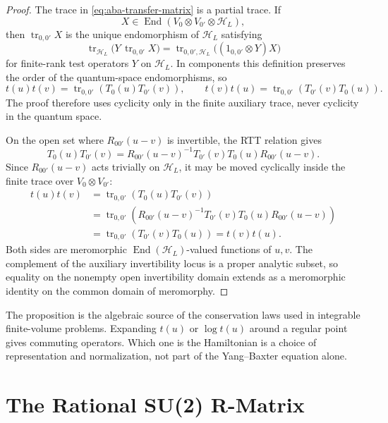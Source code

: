 \begin{proof}
The trace in \eqref{eq:aba-transfer-matrix} is a partial trace.  If
\[
  X\in\operatorname{End}(V_0\otimes V_{0'}\otimes\mathcal H_L),
\]
then \(\operatorname{tr}_{0,0'}X\) is the unique endomorphism of
\(\mathcal H_L\) satisfying
\[
  \operatorname{tr}_{\mathcal H_L}
  \bigl(Y\,\operatorname{tr}_{0,0'}X\bigr)
  =
  \operatorname{tr}_{0,0',\mathcal H_L}
  \bigl((1_{0,0'}\otimes Y)X\bigr)
\]
for finite-rank test operators \(Y\) on \(\mathcal H_L\).  In components this
definition preserves the order of the quantum-space endomorphisms, so
\[
  t(u)t(v)
  =
  \operatorname{tr}_{0,0'}\!\left(T_0(u)T_{0'}(v)\right),
  \qquad
  t(v)t(u)
  =
  \operatorname{tr}_{0,0'}\!\left(T_{0'}(v)T_0(u)\right).
\]
The proof therefore uses cyclicity only in the finite auxiliary trace, never
cyclicity in the quantum space.

On the open set where \(R_{00'}(u-v)\) is invertible, the RTT relation gives
\[
  T_0(u)T_{0'}(v)
  =
  R_{00'}(u-v)^{-1}T_{0'}(v)T_0(u)R_{00'}(u-v).
\]
Since \(R_{00'}(u-v)\) acts trivially on \(\mathcal H_L\), it may be moved
cyclically inside the finite trace over \(V_0\otimes V_{0'}\):
\[
\begin{aligned}
  t(u)t(v)
  &=
  \operatorname{tr}_{0,0'}\!\left(T_0(u)T_{0'}(v)\right)  \\
  &=
  \operatorname{tr}_{0,0'}\!\left(
    R_{00'}(u-v)^{-1}T_{0'}(v)T_0(u)R_{00'}(u-v)
  \right)                                      \\
  &=
  \operatorname{tr}_{0,0'}\!\left(T_{0'}(v)T_0(u)\right)
  =
  t(v)t(u).
\end{aligned}
\]
Both sides are meromorphic \(\operatorname{End}(\mathcal H_L)\)-valued
functions of \(u,v\).  The complement of the auxiliary invertibility locus is
a proper analytic subset, so equality on the nonempty open invertibility
domain extends as a meromorphic identity on the common domain of meromorphy.
\end{proof}

The proposition is the algebraic source of the conservation laws used in
integrable finite-volume problems.  Expanding \(t(u)\) or \(\log t(u)\) around
a regular point gives commuting operators.  Which one is the Hamiltonian is a
choice of representation and normalization, not part of the Yang--Baxter
equation alone.

\section{The Rational SU(2) R-Matrix}


